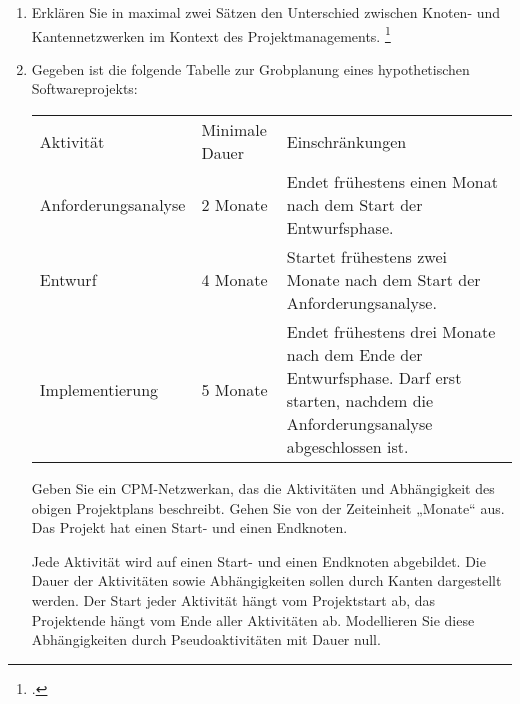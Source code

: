 \documentclass{bschlangaul-aufgabe}
\begin{document}

\begin{enumerate}


\item Erklären Sie in maximal zwei Sätzen den Unterschied zwischen
Knoten- und Kantennetzwerken im Kontext des Projektmanagements.
\footcite{examen:66116:2016:03}


\item Gegeben ist die folgende Tabelle zur Grobplanung eines
hypothetischen Softwareprojekts:

\begin{tabularx}{\linewidth}{llX}
Aktivität & Minimale Dauer & Einschränkungen\\

Anforderungsanalyse &
2 Monate &
Endet frühestens einen Monat nach dem
Start der Entwurfsphase. \\

Entwurf & 4 Monate &
Startet frühestens zwei Monate nach dem Start der
Anforderungsanalyse. \\

Implementierung & 5 Monate&

Endet frühestens drei Monate nach dem Ende der
Entwurfsphase. Darf erst starten, nachdem die
Anforderungsanalyse abgeschlossen ist.\\
\end{tabularx}

Geben Sie ein CPM-Netzwerkan, das die Aktivitäten und Abhängigkeit des
obigen Projektplans beschreibt. Gehen Sie von der Zeiteinheit „Monate“
aus. Das Projekt hat einen Start- und einen Endknoten.

Jede Aktivität wird auf einen Start- und einen Endknoten abgebildet. Die
Dauer der Aktivitäten sowie Abhängigkeiten sollen durch Kanten
dargestellt werden. Der Start jeder Aktivität hängt vom Projektstart ab,
das Projektende hängt vom Ende aller Aktivitäten ab. Modellieren Sie
diese Abhängigkeiten durch Pseudoaktivitäten mit Dauer null.


\end{enumerate}
\end{document}
